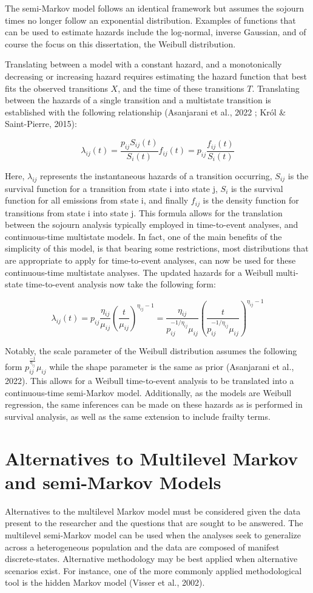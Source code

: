 \documentclass[12pt]{./styles/outhesis}
\begin{document}
The semi-Markov model follows an identical framework but assumes the
sojourn times no longer follow an exponential distribution. Examples of
functions that can be used to estimate hazards include the log-normal,
inverse Gaussian, and of course the focus on this dissertation, the
Weibull distribution.

Translating between a model with a constant hazard, and a monotonically
decreasing or increasing hazard requires estimating the hazard function
that best fits the observed transitions \(X\), and the time of these
transitions \(T\). Translating between the hazards of a single
transition and a multistate transition is established with the following
relationship (Asanjarani et al., 2022 ; Król \& Saint-Pierre, 2015):

\[
\lambda_{ij}(t) = \frac{p_{ij}S_{ij}(t)}{S_{i}(t)}f_{ij}(t) = p_{ij}\frac{f_{ij}(t)}{S_{i}(t)}
\]

Here, \(\lambda_{ij}\) represents the instantaneous hazards of a
transition occurring, \(S_{ij}\) is the survival function for a
transition from state i into state j, \(S_{i}\) is the survival
function for all emissions from state i, and finally \(f_{ij}\) is the
density function for transitions from state i into state j. This formula
allows for the translation between the sojourn analysis typically
employed in time-to-event analyses, and continuous-time multistate
models. In fact, one of the main benefits of the simplicity of this
model, is that bearing some restrictions, most distributions that are
appropriate to apply for time-to-event analyses, can now be used for
these continuous-time multistate analyses. The updated hazards for a
Weibull multi-state time-to-event analysis now take the following form:

\[
\lambda_{ij}(t)=p_{ij}\frac{\eta_{ij}}{\mu_{ij}}(\frac{t}{\mu_{ij}})^{\eta_{ij}-1}=\frac{\eta_{ij}}{p_{ij}^{-1/\eta_{ij}}\mu_{ij}}(\frac{t}{p_{ij}^{-1/\eta_{ij}}\mu_{ij}})^{\eta_{ij}-1}
\]

Notably, the scale parameter of the Weibull distribution assumes the
following form \(p_{ij}^{\frac{-1}{\eta_{ij}}}\mu_{ij}\) while the shape
parameter is the same as prior (Asanjarani et al., 2022). This allows
for a Weibull time-to-event analysis to be translated into a
continuous-time semi-Markov model. Additionally, as the models are
Weibull regression, the same inferences can be made on these hazards as
is performed in survival analysis, as well as the same extension to
include frailty terms.

\section{Alternatives to Multilevel Markov and semi-Markov Models}
Alternatives to the multilevel Markov model must be considered given the
data present to the researcher and the questions that are sought to be
answered. The multilevel semi-Markov model can be used when the analyses
seek to generalize across a heterogeneous population and the data are
composed of manifest discrete-states. Alternative methodology may be
best applied when alternative scenarios exist. For instance, one of the
more commonly applied methodological tool is the hidden Markov model
(Visser et al., 2002).
\end{document}
